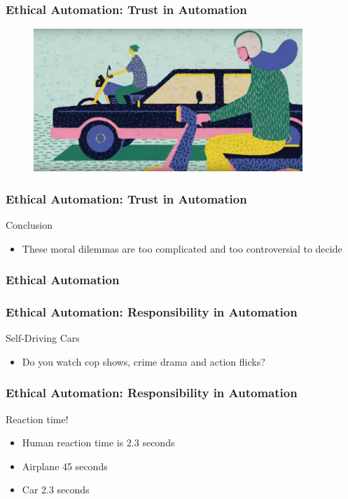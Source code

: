 \begin{frame}
  \frametitle{ Ethical Automation: Trust in Automation}
  \begin{figure}[bht]
    \centering
    \includegraphics[width=4in]{diagrams/image01}
  \end{figure}
\end{frame}


\begin{frame}
  \frametitle{ Ethical Automation: Trust in Automation}
  {\Large Conclusion}
  \begin{itemize}
    \item These moral dilemmas are too complicated and too controversial to decide
  \end{itemize}
\end{frame}


\begin{frame}
  \frametitle{ Ethical Automation}
\end{frame}


\begin{frame}
  \frametitle{ Ethical Automation: Responsibility in Automation}
  {\Large Self-Driving Cars}
  \begin{itemize}
    \item Do you watch cop shows, crime drama and action flicks?
  \end{itemize}
\end{frame}

\begin{frame}
  \frametitle{ Ethical Automation: Responsibility in Automation}
  {\Large Reaction time!}
  \begin{itemize}
    \item Human reaction time is 2.3 seconds
    \item Airplane 45 seconds
    \item Car 2.3 seconds
  \end{itemize}
\end{frame}

